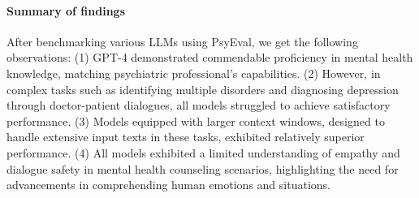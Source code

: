 \paragraph{Summary of findings} After benchmarking various LLMs using PsyEval, we get the following observations: (1) GPT-4 demonstrated commendable proficiency in mental health knowledge, matching psychiatric professional's capabilities. (2) However, in complex tasks such as identifying multiple disorders and diagnosing depression through doctor-patient dialogues, all models struggled to achieve satisfactory performance. (3) Models equipped with larger context windows, designed to handle extensive input texts in these tasks, exhibited relatively superior performance. (4) All models exhibited a limited understanding of empathy and dialogue safety in mental health counseling scenarios, highlighting the need for advancements in comprehending human emotions and situations. %








